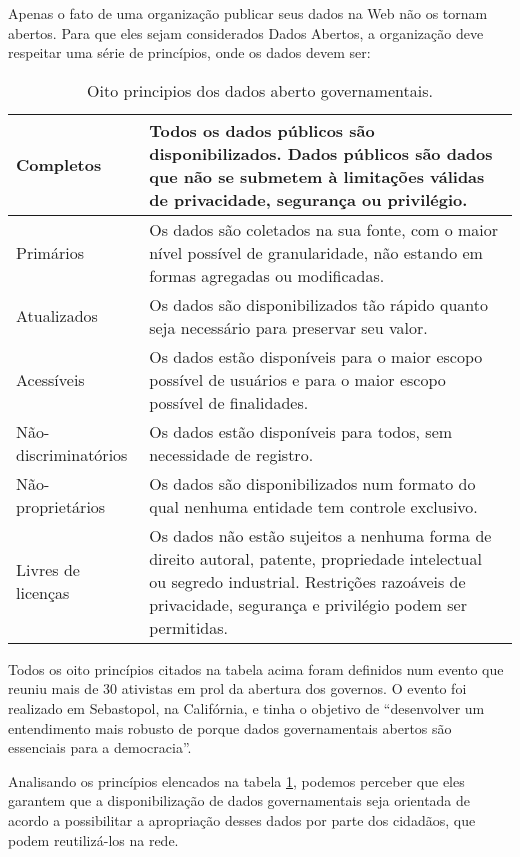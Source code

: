 Apenas o fato de uma organização publicar seus dados na Web não os tornam abertos. Para que eles sejam considerados Dados Abertos, a organização deve respeitar uma série de princípios, onde os dados devem ser:
\begin{table}[H]
\begin{center}
    \begin{tabular}{ | l | p{11cm} | }
    \hline
   Completos & Todos os dados públicos são disponibilizados. Dados públicos são dados que não se submetem à limitações válidas de privacidade, segurança ou privilégio. \\ \hline
    Primários & Os dados são coletados na sua fonte, com o maior nível possível de granularidade, não estando em formas agregadas ou modificadas. \\ \hline
   Atualizados & Os dados são disponibilizados tão rápido quanto seja necessário para preservar seu valor. \\ \hline
   Acessíveis & Os dados estão disponíveis para o maior escopo possível de usuários e para o maior escopo possível de finalidades. \\ \hline
Não-discriminatórios & Os dados estão disponíveis para todos, sem necessidade de registro. \\ \hline
Não-proprietários & Os dados são disponibilizados num formato do qual nenhuma entidade tem controle exclusivo.\\ \hline
Livres de licenças & Os dados não estão sujeitos a nenhuma forma de direito autoral, patente, propriedade intelectual ou segredo industrial. Restrições razoáveis de privacidade, segurança e privilégio podem ser permitidas.\\ \hline
   \end{tabular}
    \caption{Oito principios dos dados aberto governamentais.}
    \label{tab-principios}
\end{center}
\end{table}
Todos os oito princípios citados na tabela acima foram definidos num evento que reuniu mais de 30 ativistas em prol da abertura dos governos. O evento foi realizado em Sebastopol, na Califórnia, e tinha o objetivo de “desenvolver um entendimento mais robusto de porque dados governamentais abertos são essenciais para a democracia”.

Analisando os princípios elencados na tabela \ref{tab-principios}, podemos perceber que eles garantem que a disponibilização de dados governamentais seja orientada de acordo a possibilitar a apropriação desses dados por parte dos cidadãos, que podem reutilizá-los na rede.

